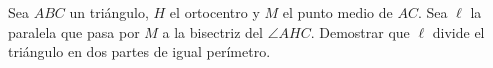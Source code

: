 Sea $ABC$ un triángulo, $H$ el ortocentro y $M$ el punto medio de $AC$. Sea $\ell$ la paralela que pasa por $M$ a la bisectriz del $\angle AHC$. Demostrar que $\ell$ divide el triángulo en dos partes de igual perímetro.
